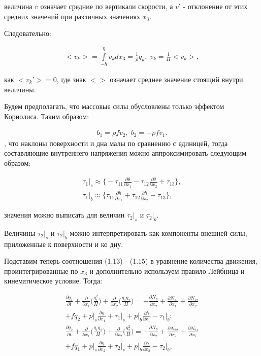 \documentclass[14pt]{extreport}
\begin{document}
 величина $\overline{v}$ означает средние по вертикали скорости, а $v’$ - отклонение от этих средних значений при различных значениях $x_3$.

Следовательно:

\begin{gather}
<v_k>=\int\limits^\eta_{-h} v_k dx_3 = \frac{1}{\rho} q_k, \; v_k=\frac{1}{H}<v_k>,
\end{gather}

 как $ <v_k’> = 0 $, где знак $ <> $ означает среднее значение стоящий внутри величины.

Будем предполагать, что массовые силы обусловлены только эффектом Кориолиса. Таким образом:

\begin{gather}
b_1 = \rho f v_2, \; b_2 = - \rho f v_1.
\end{gather}
, что наклоны поверхности и дна малы по сравнению с единицей, тогда составляющие внутреннего напряжения можно аппроксимировать следующим образом:

\begin{gather}
 \tau_1\bigg|_s \approx \bigg\{ -\tau_{11}\frac{\partial \theta}{\partial x_1} -\tau_{12}\frac{\partial \theta}{\partial x_2} +\tau_{13}\bigg\}, \nonumber \\
\tau_1\bigg|_b \approx \bigg\{ \tau_{11}\frac{\partial h}{\partial x_1} +\tau_{12}\frac{\partial h}{\partial x_2} -\tau_{13}\bigg\},
\end{gather}

 значения можно выписать для величин $\tau_2|_s$ и $\tau_2|_b$.

Величины $\tau_2|_s$ и $\tau_2|_b$ можно интерпретировать как компоненты внешней силы, приложенные к поверхности и ко дну.

Подставим теперь соотношения (1.13) - (1.15) в уравнение количества движения, проинтегрированные по $x_3$ и дополнительно используем правило Лейбница и кинематическое условие. Тогда:

\begin{gather} 
\frac{\partial q_1}{\partial t} + \frac{\partial}{\partial x_1} \bigg(\frac{q_1^2}{H}\bigg)+\frac{\partial }{\partial x_2}\bigg(\frac{q_1 q_2}{H}\bigg) = -\frac{\partial N_p}{\partial x_2} + \frac{\partial N_{11}}{\partial x_1} + \frac{\partial N_{12}}{\partial x_2} \nonumber\\+ fq_2 + p\bigg|_s \frac{\partial \eta}{\partial x_1} + \tau_1\bigg|_s+p\bigg|_b\frac{\partial h}{\partial x_1} - \tau_1\bigg|_b;  \nonumber\\
\frac{\partial q_2}{\partial t} + \frac{\partial}{\partial x_1} \bigg(\frac{q_1 q_2}{H}\bigg)+\frac{\partial }{\partial x_2}\bigg(\frac{q_2^2}{H}\bigg) = -\frac{\partial N_p}{\partial x_2} + \frac{\partial N_{22}}{\partial x_2} + \frac{\partial N_{21}}{\partial x_1} \nonumber\\+ fq_1 + p\bigg|_s \frac{\partial \eta}{\partial x_2} + \tau_2\bigg|_s+p\bigg|_b\frac{\partial h}{\partial x_2} - \tau_2\bigg|_b,
\end{gather}
\end{document}
